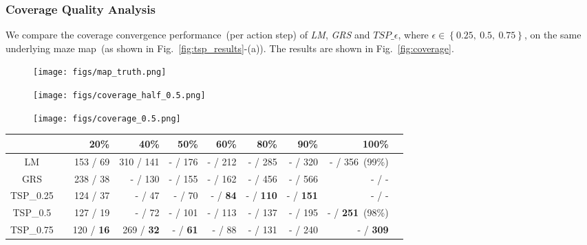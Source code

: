 \subsubsection{Coverage Quality Analysis}
We compare the coverage convergence performance~(per action step) of \textit{LM}, \textit{GRS} and $TSP\_\epsilon$, where $\epsilon \in \left \{ 0.25,~0.5,~0.75 \right \}$, on the same underlying maze map~(as shown in Fig.~\ref{fig:tsp_results}-(a)). The results are shown in Fig.~\ref{fig:coverage}. 

\begin{figure*}%
  \centering
  \begin{subfigure}[b]{0.19\linewidth}
    \texttt{[image: figs/map\_truth.png]}
    \caption{}
  \end{subfigure}
  \begin{subfigure}[b]{0.39\linewidth}
    \texttt{[image: figs/coverage\_half\_0.5.png]}
    \caption{}
  \end{subfigure}
  \begin{subfigure}[b]{0.39\linewidth}
    \texttt{[image: figs/coverage\_0.5.png]}
    \caption{}
  \end{subfigure}
  \caption{\small (a)~Ground-truth map for coverage planning. (b)~\textit{Left}: Real sensed map and \textit{Right}: predicted map at the middle of steps for TSP\_{0.5}. (c)~\textit{Left}: Real sensed map and \textit{Right}: predicted map at the ending step for TSP\_{0.5} }
  \label{fig:tsp_results}
\end{figure*}

\begin{table*}%
\caption{Coverage performance comparison} %
\centering %
\begin{tabular}{c rrrrrrrrr} %
\hline\hline %
  & \vline & 20\% & 40\% & 50\% & 60\% & 80\% & 90\% & 100\% \\
\hline %
LM & \vline & 153 / 69 & 310 / 141 & - / 176 & - / 212 & - / 285 & - / 320 &  - / 356~(99\%)\\ [1ex]%
GRS & \vline & 238 / 38 & - / 130 & - / 155 & - / 162 & - / 456 & - / 566 & - / -\\ [1ex]%
TSP\_0.25 & \vline & 124 / 37 & - / 47 & - / 70 & - / \textbf{84} & - / \textbf{110} & - / \textbf{151} & - / - \\ [1ex]
TSP\_0.5 & \vline & 127 / 19 & - / 72 & - / 101 & - / 113 & - / 137 & - / 195 & - / \textbf{251}~(98\%)\\ [1ex]
TSP\_0.75 & \vline & 120  / \textbf{16} & 269 / \textbf{32} & - / \textbf{61} & - / 88 & - / 131 & - / 240 & - / \textbf{309} \\
\hline %
\end{tabular}
\label{tb:coverage_comparison}
\end{table*}

